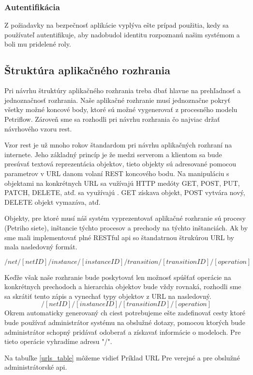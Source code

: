 \subsubsection{Autentifikácia}
Z požiadavky na bezpečnosť aplikácie vyplýva ešte prípad použitia, kedy sa používateľ autentifikuje, aby nadobudol identitu rozpoznanú našim systémom a boli mu pridelené roly.

\subsection{Štruktúra aplikačného rozhrania}
Pri návrhu štruktúry aplikačného rozhrania treba dbať hlavne na prehľadnosť a jednoznačnosť rozhrania. Naše aplikačné rozhranie musí jednoznačne pokryť všetky možné koncové body, ktoré sú možné vygenerovať z procesného modelu Petriflow. Zároveň sme sa rozhodli pri návrhu rozhrania čo najviac držať návrhového vzoru \acrshort{rest}. 

Vzor \acrshort{rest} je už mnoho rokov štandardom pri návrhu aplikačných rozhraní na internete. Jeho základný princíp je že medzi serverom a klientom sa bude presúvať textová reprezentácia objektov, tieto objekty sú adresované pomocou parametrov v URL danom volaní REST koncového bodu. Na manipuláciu s objektami na konkrétnych URL sa vužívajú HTTP medóty GET, POST, PUT, PATCH, DELETE, atď.  sa využívajú . GET získava objekt, POST vytvára nový, DELETE objekt vymazáva, atď.

Objekty, pre ktoré musí náš systém vyprezentovať aplikačné rozhranie sú  procesy (Petriho siete), inštancie týchto procesov a prechody na týchto inštanciách. Ak by sme mali implementovať plné RESTful \acrshort{api} so štandatrnou štrukúrou URL by mala nasledovný formát.

\[/net/[netID]/instance/[instanceID]/transition/[transitionID]/[operation] \]

Keďže však naše rozhranie bude poskytovať len možnosť spúšťať operácie na konkrétnych prechodoch a hierarchia objektov bude vždy rovnaká, rozhodli sme sa skrátiť tento zápis a vynechať typy objektov z URL na nasledovný.
\[/[netID]/[instanceID]/[transitionID]/[operation] \]
Okrem automaticky generovaný ch ciest potrebujeme ešte zadefinovať cesty ktoré bude používať administrátor systému na obslužné dotazy, pomocou ktorých bude administrátor schopný pridávať odoberať a získavať informácie o modeloch. Pre tieto operácie vyhradíme adresu "/".

Na tabuľke \ref{urls_table} môžeme vidieť  Príklad URL Pre verejné a pre obslužné administrátorské \acrshort{api}.

